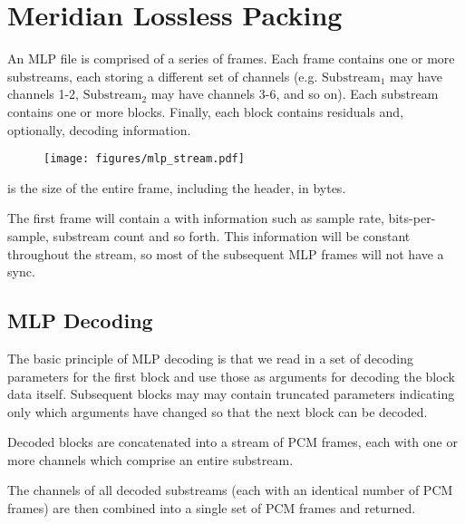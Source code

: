 
\chapter{Meridian Lossless Packing}

An MLP file is comprised of a series of frames.
Each frame contains one or more substreams, each storing a different
set of channels (e.g. $\text{Substream}_1$ may have channels 1-2,
$\text{Substream}_2$ may have channels 3-6, and so on).
Each substream contains one or more blocks.
Finally, each block contains  residuals
and, optionally, decoding information.
\begin{figure}[h]
\texttt{[image: figures/mlp\_stream.pdf]}
\end{figure}
\par
\noindent
{} is the size of the entire frame,
including the header, in bytes.
\par
The first frame will contain a  with information
such as sample rate, bits-per-sample, substream count and so forth.
This information will be constant throughout the stream,
so most of the subsequent MLP frames will not have a sync.

\section{MLP Decoding}

The basic principle of MLP decoding is that we read in a
set of decoding parameters for the first block and use those
as arguments for decoding the block data itself.
Subsequent blocks may may contain truncated parameters
indicating only which arguments have changed so that the
next block can be decoded.

Decoded blocks are concatenated into a stream of PCM frames,
each with one or more channels which comprise an entire substream.

The channels of all decoded substreams
(each with an identical number of PCM frames) are then combined
into a single set of PCM frames and returned.

\clearpage

